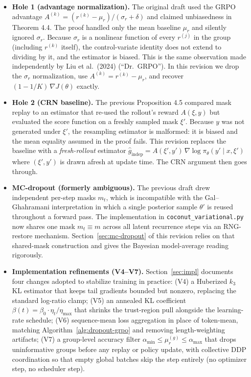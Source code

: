 \documentclass[11pt]{article}
\theoremstyle{definition}
\theoremstyle{remark}
\begin{document}
\begin{itemize}[topsep=2pt,itemsep=2pt]
\item \textbf{Hole 1 (advantage normalization).}  The original draft used
      the GRPO advantage
      $A^{(k)} = (r^{(k)} - \mu_r)/(\sigma_r + \delta)$
      and claimed unbiasedness in Theorem 4.4.  The proof handled only the
      mean baseline $\mu_r$ and silently ignored $\sigma_r$.  Because
      $\sigma_r$ is a nonlinear function of every $r^{(j)}$ in the group
      (including $r^{(k)}$ itself), the control-variate identity does not
      extend to dividing by it, and the estimator is biased.  This is the
      same observation made independently by Liu et al.\ (2024)
      (``Dr.\ GRPO'').  In this revision we drop the $\sigma_r$
      normalization, use $A^{(k)} = r^{(k)} - \mu_r$, and recover
      $(1 - 1/K)\,\nabla J(\theta)$ exactly.
\item \textbf{Hole 2 (CRN baseline).}  The previous Proposition 4.5
      compared mask replay to an estimator that re-used the rollout's
      reward $A(\xi,y)$ but evaluated the score function on a freshly
      sampled mask $\xi'$.  Because $y$ was not generated under $\xi'$,
      the resampling estimator is malformed: it is biased and the mean
      equality assumed in the proof fails.  This revision replaces the
      baseline with a \emph{fresh-rollout} estimator
      $\hat g_{\mathrm{indep}} = A(\xi',y')\,\nabla \log \pi_\theta(y'\mid x,\xi')$
      where $(\xi',y')$ is drawn afresh at update time.  The CRN argument
      then goes through.
\item \textbf{MC-dropout (formerly ambiguous).}  The previous draft drew
      independent per-step masks $m_t$, which is incompatible with the
      Gal--Ghahramani interpretation in which a single posterior sample
      $\theta'$ is reused throughout a forward pass.  The implementation
      in \texttt{coconut\_variational.py} now shares one mask
      $m_t \equiv m$ across all latent recurrence steps via an
      RNG-restore mechanism.  Section~\ref{sec:mc-dropout} of this
      revision relies on that shared-mask construction and gives the
      Bayesian model-average reading rigorously.
\item \textbf{Implementation refinements (V4--V7).}  Section~\ref{sec:impl}
      documents four changes adopted to stabilize training in practice:
      (V4) a Huberized $k_3$ KL estimator that keeps tail gradients bounded
      but nonzero, replacing the standard log-ratio clamp;
      (V5) an annealed KL coefficient $\beta(t) = \beta_0 \cdot \eta_t/\eta_{\max}$
      that shrinks the trust-region pull alongside the learning-rate
      schedule;
      (V6) sequence-mean loss aggregation in place of token-mean, matching
      Algorithm~\ref{alg:dropout-grpo} and removing length-weighting
      artifacts;
      (V7) a group-level accuracy filter
      $\alpha_{\min} \le \mu_{r}^{(g)} \le \alpha_{\max}$ that drops
      uninformative groups before any replay or policy update, with
      collective DDP coordination so that empty global batches skip the
      step entirely (no optimizer step, no scheduler step).
\end{itemize}
\end{document}
